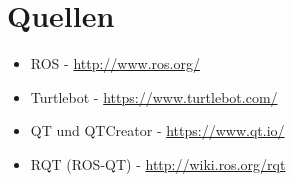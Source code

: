 \documentclass[a4paper,12pt,headsepline]{scrartcl}
\begin{document}
	\newpage
	\section{Quellen}
		\begin{itemize}
			\item ROS - \href{http://www.ros.org/}{http://www.ros.org/}
			\item Turtlebot - \href{https://www.turtlebot.com/}{https://www.turtlebot.com/}
			\item QT und QTCreator - \href{https://www.qt.io/}{https://www.qt.io/}
			\item RQT (ROS-QT) - \href{http://wiki.ros.org/rqt}{http://wiki.ros.org/rqt}
		\end{itemize}
\end{document}
